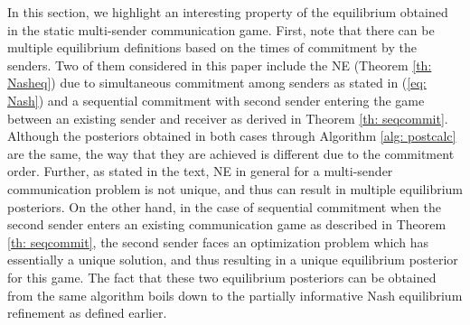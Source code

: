 \documentclass[12pt,journal,onecolumn]{IEEEtran}
\begin{document}



In this section, we highlight an interesting property of the equilibrium obtained in the static multi-sender communication game. First, note that there can be multiple equilibrium definitions based on the times of commitment by the senders. Two of them considered in this paper include the NE (Theorem \ref{th: Nasheq}) due to simultaneous commitment among senders as stated in (\ref{eq: Nash}) and a sequential commitment with second sender entering the game between an existing sender and receiver as derived in Theorem \ref{th: seqcommit}. Although the posteriors obtained in both cases through Algorithm \ref{alg: postcalc} are the same, the way that they are achieved is different due to the commitment order. Further, as stated in the text, NE in general for a multi-sender communication problem is not unique, and thus can result in multiple equilibrium posteriors. On the other hand, in the case of sequential commitment when the second sender enters an existing communication game as described in Theorem \ref{th: seqcommit}, the second sender faces an optimization problem which has essentially a unique solution, and thus resulting in a unique equilibrium posterior for this game. The fact that these two equilibrium posteriors can be obtained from the same algorithm boils down to the partially informative Nash equilibrium refinement as defined earlier.
\end{document}
